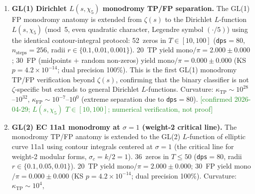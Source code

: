 \documentclass[11pt, a4paper]{article}
\theoremstyle{definition}
\theoremstyle{plain}
\begin{document}
\begin{enumerate}
        Across 34~computable TP (of 48 total; 14 excluded due to AFE
        precision loss at $t \geq 24$), mono$/\pi = 2.000 \pm 0.000$.
        Across 60~FP, mono$/\pi = 0.000 \pm 0.000$
        (Mann--Whitney $p = 9.7 \times 10^{-17}$).
        The dual criterion ($\kappa + \mathrm{mono}$) at $\kappa > 0.5$
        improves precision from $37.0\%$ to $100.0\%$ ($+63.0$ p.p.).
        All three GL(2) $L$-functions (conductor $N = 11, 37, 1$;
        weight $k = 2, 2, 12$; root number $\varepsilon = +1, -1, +1$)
        produce the same binary pattern as GL(1)~$\zeta$,
        establishing \emph{degree-independent} monodromy classification.
        \textcolor{ForestGreen}{[confirmed 2026-04-16; 34 TP + 60 FP; numerical verification, not proof]}
  \item \textbf{GL(1) Dirichlet $L(s,\chi_5)$ monodromy TP/FP separation.}
        The GL(1) FP monodromy anatomy is extended from $\zeta(s)$ to the
        Dirichlet $L$-function $L(s,\chi_5)$ (mod~5, even quadratic character,
        Legendre symbol $(\cdot/5)$) using the identical contour-integral
        protocol: 52~zeros in $T\in[10,100]$ (\texttt{dps}$=80$,
        $n_{\mathrm{steps}}=256$, radii $r\in\{0.1, 0.01, 0.001\}$).
        20~TP yield mono$/\pi = 2.000 \pm 0.000$;
        30~FP (midpoints $+$ random non-zeros) yield
        mono$/\pi = 0.000 \pm 0.000$
        (KS $p = 4.2 \times 10^{-14}$; dual precision 100\%).
        This is the first GL(1) monodromy TP/FP verification beyond $\zeta(s)$,
        confirming that the binary classifier is not $\zeta$-specific
        but extends to general Dirichlet $L$-functions.
        Curvature: $\kappa_{\mathrm{TP}} \sim 10^{28}$--$10^{32}$,
        $\kappa_{\mathrm{FP}} \sim 10^{-7}$--$10^{0}$ (extreme separation
        due to \texttt{dps}$=80$).
        \textcolor{ForestGreen}{[confirmed 2026-04-29; $L(s,\chi_5)$ $T\in[10,100]$; numerical verification, not proof]}
  \item \textbf{GL(2) EC 11a1 monodromy at $\sigma = 1$ (weight-2 critical line).}
        The monodromy TP/FP anatomy is extended to the GL(2) $L$-function of
        elliptic curve 11a1 using contour integrals centered at
        $\sigma = 1$ (the critical line for weight-2 modular forms,
        $\sigma_c = k/2 = 1$).  36~zeros in $T \leq 50$
        (\texttt{dps}$=80$, radii $r\in\{0.1, 0.05, 0.01\}$).
        20~TP yield mono$/\pi = 2.000 \pm 0.000$;
        30~FP yield mono$/\pi = 0.000 \pm 0.000$
        (KS $p = 4.2 \times 10^{-14}$; dual precision 100\%).
        Curvature: $\kappa_{\mathrm{TP}} \sim 10^{4}$,

\end{enumerate}
\end{document}
